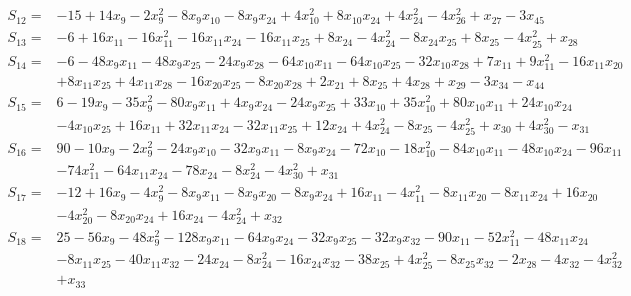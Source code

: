 \begin{align*}
S_{12}={}&-15+14x_{9}-2x_{9}^{2}-8x_{9}x_{10}-8x_{9}x_{24}+4x_{10}^{2}+8x_{10}x_{24}+4x_{24}^{2}-4x_{26}^{2}+x_{27}-3x_{45}
\end{align*}
\begin{align*}
S_{13}={}&-6+16x_{11}-16x_{11}^{2}-16x_{11}x_{24}-16x_{11}x_{25}+8x_{24}-4x_{24}^{2}-8x_{24}x_{25}+8x_{25}-4x_{25}^{2}+x_{28}
\end{align*}
\begin{align*}
S_{14}={}&-6-48x_{9}x_{11}-48x_{9}x_{25}-24x_{9}x_{28}-64x_{10}x_{11}-64x_{10}x_{25}-32x_{10}x_{28}+7x_{11}+9x_{11}^{2}-16x_{11}x_{20}\\
{}&+8x_{11}x_{25}+4x_{11}x_{28}-16x_{20}x_{25}-8x_{20}x_{28}+2x_{21}+8x_{25}+4x_{28}+x_{29}-3x_{34}-x_{44}
\end{align*}
\begin{align*}
S_{15}={}&6-19x_{9}-35x_{9}^{2}-80x_{9}x_{11}+4x_{9}x_{24}-24x_{9}x_{25}+33x_{10}+35x_{10}^{2}+80x_{10}x_{11}+24x_{10}x_{24}\\
{}&-4x_{10}x_{25}+16x_{11}+32x_{11}x_{24}-32x_{11}x_{25}+12x_{24}+4x_{24}^{2}-8x_{25}-4x_{25}^{2}+x_{30}+4x_{30}^{2}-x_{31}
\end{align*}
\begin{align*}
S_{16}={}&90-10x_{9}-2x_{9}^{2}-24x_{9}x_{10}-32x_{9}x_{11}-8x_{9}x_{24}-72x_{10}-18x_{10}^{2}-84x_{10}x_{11}-48x_{10}x_{24}-96x_{11}\\
{}&-74x_{11}^{2}-64x_{11}x_{24}-78x_{24}-8x_{24}^{2}-4x_{30}^{2}+x_{31}
\end{align*}
\begin{align*}
S_{17}={}&-12+16x_{9}-4x_{9}^{2}-8x_{9}x_{11}-8x_{9}x_{20}-8x_{9}x_{24}+16x_{11}-4x_{11}^{2}-8x_{11}x_{20}-8x_{11}x_{24}+16x_{20}\\
{}&-4x_{20}^{2}-8x_{20}x_{24}+16x_{24}-4x_{24}^{2}+x_{32}
\end{align*}
\begin{align*}
S_{18}={}&25-56x_{9}-48x_{9}^{2}-128x_{9}x_{11}-64x_{9}x_{24}-32x_{9}x_{25}-32x_{9}x_{32}-90x_{11}-52x_{11}^{2}-48x_{11}x_{24}\\
{}&-8x_{11}x_{25}-40x_{11}x_{32}-24x_{24}-8x_{24}^{2}-16x_{24}x_{32}-38x_{25}+4x_{25}^{2}-8x_{25}x_{32}-2x_{28}-4x_{32}-4x_{32}^{2}\\
{}&+x_{33}
\end{align*}
